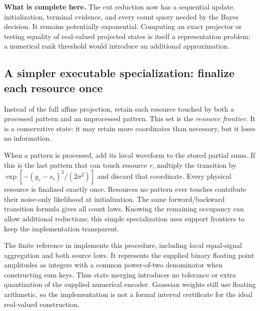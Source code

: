 \documentclass[10pt,a4paper]{article}
\begin{document}
\textbf{What is complete here.} The cut reduction now has a sequential update, initialization, terminal evidence,
and every count query needed by the Bayes decision. It remains potentially exponential. Computing an exact
projector or testing equality of real-valued projected states is itself a representation problem; a numerical
rank threshold would introduce an additional approximation.

\clearpage
\subsection{A simpler executable specialization: finalize each resource once}
Instead of the full affine projection, retain each resource touched by both a processed pattern and an
unprocessed pattern. This set is the \emph{resource frontier}. It is a conservative state: it may retain more
coordinates than necessary, but it loses no information.

When a pattern is processed, add its local waveform to the stored partial sums. If this is the last pattern
that can touch resource $r$, multiply the transition by
$\exp[-(y_r-s_r)^2/(2\sigma^2)]$ and discard that coordinate. Every physical resource is finalized exactly once.
Resources no pattern ever touches contribute their noise-only likelihood at initialization.
The same forward/backward transition formula gives all count laws.
Knowing the remaining occupancy can allow additional reductions; this simple specialization uses support
frontiers to keep the implementation transparent.

The finite reference in  implements this procedure, including local
equal-signal aggregation and both source laws. It represents the supplied binary floating point amplitudes
as integers with a common power-of-two denominator when constructing sum keys. Thus state merging introduces
no tolerance or extra quantization of the supplied numerical encoder. Gaussian weights still use floating
arithmetic, so the implementation is not a formal interval certificate for the ideal real-valued construction.
\end{document}
